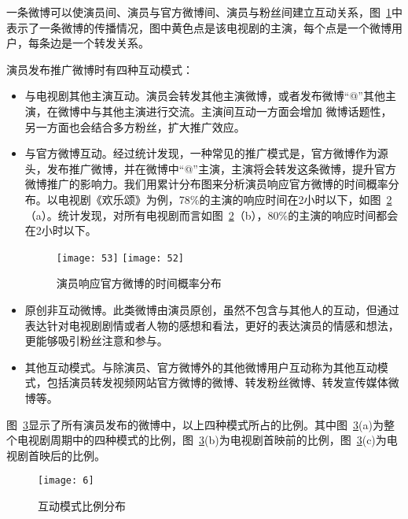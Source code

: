 一条微博可以使演员间、演员与官方微博间、演员与粉丝间建立互动关系，图~\ref{inter}中表示了一条微博的传播情况，图中黄色点是该电视剧的主演，每个点是一个微博用户，每条边是一个转发关系。

演员发布推广微博时有四种互动模式：
\begin{itemize}

\begin{figure}[H]
\centering
\texttt{[image: 微博互动]}
\caption{微博互动关系}
\label{inter}
\end{figure}

\item[（1）]与电视剧其他主演互动。演员会转发其他主演微博，或者发布微博“@”其他主演，在微博中与其他主演进行交流。主演间互动一方面会增加 微博话题性，另一方面也会结合多方粉丝，扩大推广效应。

\item[（2）]与官方微博互动。经过统计发现，一种常见的推广模式是，官方微博作为源头，发布推广微博，并在微博中“@”主演，主演将会转发这条微博，提升官方微博推广的影响力。我们用累计分布图来分析演员响应官方微博的时间概率分布。以电视剧《欢乐颂》为例，78\%的主演的响应时间在2小时以下，如图~\ref{fig}（a）。统计发现，对所有电视剧而言如图~\ref{fig}（b），80\%的主演的响应时间都会在2小时以下。

\begin{figure}[h]
  \centering%
    {\texttt{[image: 53]}}
      {\texttt{[image: 52]}}
  \caption{演员响应官方微博的时间概率分布}
  \label{fig}
\end{figure}

\item[（3）]原创非互动微博。此类微博由演员原创，虽然不包含与其他人的互动，但通过表达针对电视剧剧情或者人物的感想和看法，更好的表达演员的情感和想法，更能够吸引粉丝注意和参与。

\item[（4）]其他互动模式。与除演员、官方微博外的其他微博用户互动称为其他互动模式，包括演员转发视频网站官方微博的微博、转发粉丝微博、转发宣传媒体微博等。

\end{itemize}

图~\ref{inter3}显示了所有演员发布的微博中，以上四种模式所占的比例。其中图~\ref{inter3}(a)为整个电视剧周期中的四种模式的比例，图~\ref{inter3}(b)为电视剧首映前的比例，图~\ref{inter3}(c)为电视剧首映后的比例。

\begin{figure}[!htbp]
\centering
\texttt{[image: 6]}
\caption{互动模式比例分布}
\label{inter3}
\end{figure}

